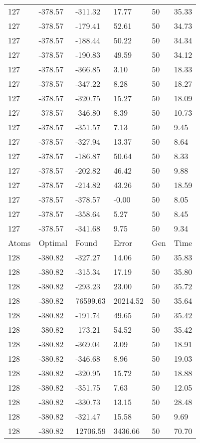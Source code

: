 \documentclass{report}
\begin{document}
\begin{appendix}
\begin{longtable}{llllll}
127 & -378.57 & -311.32 & 17.77 & 50 & 35.33 \\
127 & -378.57 & -179.41 & 52.61 & 50 & 34.73 \\
127 & -378.57 & -188.44 & 50.22 & 50 & 34.34 \\
127 & -378.57 & -190.83 & 49.59 & 50 & 34.12 \\
127 & -378.57 & -366.85 & 3.10 & 50 & 18.33 \\
127 & -378.57 & -347.22 & 8.28 & 50 & 18.27 \\
127 & -378.57 & -320.75 & 15.27 & 50 & 18.09 \\
127 & -378.57 & -346.80 & 8.39 & 50 & 10.73 \\
127 & -378.57 & -351.57 & 7.13 & 50 & 9.45 \\
127 & -378.57 & -327.94 & 13.37 & 50 & 8.64 \\
127 & -378.57 & -186.87 & 50.64 & 50 & 8.33 \\
127 & -378.57 & -202.82 & 46.42 & 50 & 9.88 \\
127 & -378.57 & -214.82 & 43.26 & 50 & 18.59 \\
127 & -378.57 & -378.57 & -0.00 & 50 & 8.05 \\
127 & -378.57 & -358.64 & 5.27 & 50 & 8.45 \\
127 & -378.57 & -341.68 & 9.75 & 50 & 9.34 \\
Atoms & Optimal & Found & Error & Gen & Time \\
128 & -380.82 & -327.27 & 14.06 & 50 & 35.83 \\
128 & -380.82 & -315.34 & 17.19 & 50 & 35.80 \\
128 & -380.82 & -293.23 & 23.00 & 50 & 35.72 \\
128 & -380.82 & 76599.63 & 20214.52 & 50 & 35.64 \\
128 & -380.82 & -191.74 & 49.65 & 50 & 35.42 \\
128 & -380.82 & -173.21 & 54.52 & 50 & 35.42 \\
128 & -380.82 & -369.04 & 3.09 & 50 & 18.91 \\
128 & -380.82 & -346.68 & 8.96 & 50 & 19.03 \\
128 & -380.82 & -320.95 & 15.72 & 50 & 18.88 \\
128 & -380.82 & -351.75 & 7.63 & 50 & 12.05 \\
128 & -380.82 & -330.73 & 13.15 & 50 & 28.48 \\
128 & -380.82 & -321.47 & 15.58 & 50 & 9.69 \\
128 & -380.82 & 12706.59 & 3436.66 & 50 & 70.70 \\

\end{longtable}
\end{appendix}
\end{document}

